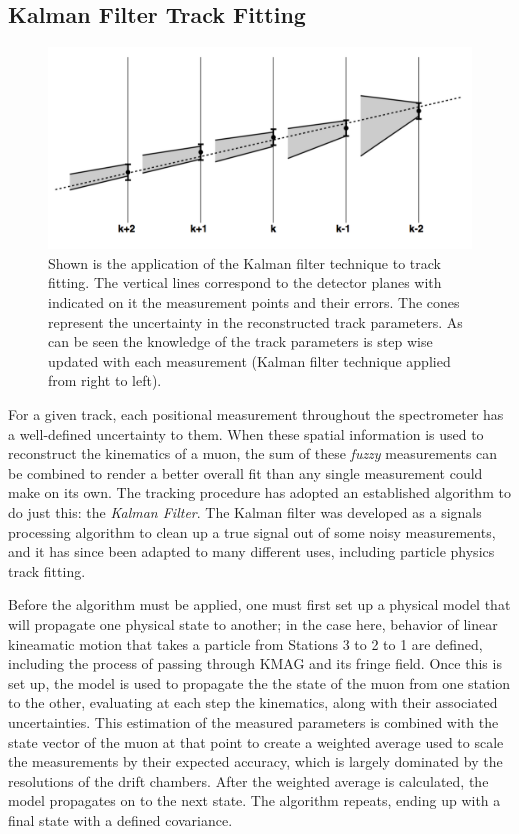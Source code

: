 \subsection{Kalman Filter Track Fitting}

\begin{figure}
	\centering
	\includegraphics[height=0.3\textheight]{figures/analysis/kalman-steps.png}
	\caption{Shown is the application of the Kalman filter technique to track fitting\cite{vanderEijk:2002sp}. The vertical lines correspond to the detector planes with indicated on it the measurement points and their errors. The cones represent the uncertainty in the reconstructed track parameters. As can be seen the knowledge of the track parameters is step wise updated with each measurement (Kalman filter technique applied from right to left).}
	\label{fig:kalman-steps}
\end{figure}

For a given track, each positional measurement throughout the spectrometer has a well-defined uncertainty to them. When these spatial information is used to reconstruct the kinematics of a muon, the sum of these \emph{fuzzy} measurements can be combined to render a better overall fit than any single measurement could make on its own. The tracking procedure has adopted an established algorithm to do just this: the \emph{Kalman Filter}\cite{kalman:1960}. The Kalman filter was developed as a signals processing algorithm to clean up a true signal out of some noisy measurements, and it has since been adapted to many different uses, including particle physics track fitting.

Before the algorithm must be applied, one must first set up a physical model that will propagate one physical state to another; in the case here, behavior of linear kineamatic motion that takes a particle from Stations 3 to 2 to 1 are defined, including the process of passing through KMAG and its fringe field. Once this is set up, the model is used to propagate the the state of the muon from one station to the other, evaluating at each step the kinematics, along with their associated uncertainties. This estimation of the measured parameters is combined with the state vector of the muon at that point to create a weighted average used to scale the measurements by their expected accuracy, which is largely dominated by the resolutions of the drift chambers. After the weighted average is calculated, the model propagates on to the next state. The algorithm repeats, ending up with a final state with a defined covariance.

